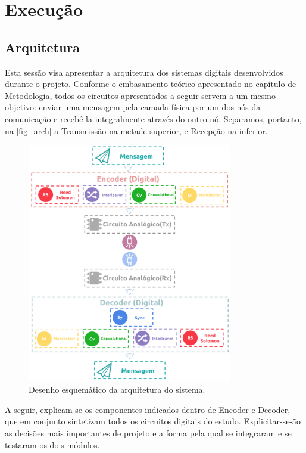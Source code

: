 	\chapter{Execução}\label{cap-execucao}

	\section{Arquitetura}
	Esta sessão visa apresentar a arquitetura dos sistemas digitais desenvolvidos durante o projeto. Conforme o embasamento teórico apresentado no capítulo de Metodologia, todos os circuitos apresentados a seguir servem a um mesmo objetivo: enviar uma mensagem pela camada física por um dos nós da comunicação e recebê-la integralmente através do outro nó. Separamos, portanto, na \autoref{fig_arch} a Transmissão na metade superior, e Recepção na inferior.

	\begin{figure}[h!]
		\caption{\label{fig_arch}Desenho esquemático da arquitetura do sistema.}
		\centering
		\includegraphics[width=0.8\textwidth]{Arquitetura.pdf}
	\end{figure}

	A seguir, explicam-se os componentes indicados dentro de Encoder e Decoder, que em conjunto sintetizam todos os circuitos digitais do estudo. Explicitar-se-ão as decisões mais importantes de projeto e a forma pela qual se integraram e se testaram os dois módulos.

